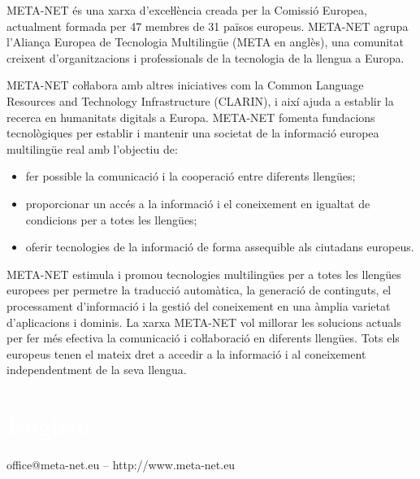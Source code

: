 \begin{multicols}{2}

META-NET és una xarxa d’exceŀlència creada per la Comissió Europea, actualment formada per 47 membres de 31 països europeus. META-NET agrupa l’Aliança Europea de Tecnologia Multilingüe (META en anglès), una comunitat creixent d’organitzacions i professionals de la tecnologia de la llengua a Europa. 

META-NET coŀlabora amb altres iniciatives com la Common Language Resources and Technology Infrastructure (CLARIN), i així ajuda a establir la recerca en humanitats digitals a Europa. META-NET fomenta fundacions tecnològiques per establir i mantenir una societat de la informació europea multilingüe real amb l’objectiu de:
\begin{itemize}
\item fer possible la comunicació i la cooperació entre diferents llengües;
\item proporcionar un accés a la informació i el coneixement en igualtat de condicions per a totes les llengües;
\item oferir tecnologies de la informació de forma assequible als ciutadans europeus.
\end{itemize}

META-NET estimula i promou tecnologies multilingües per a totes les llengües europees per permetre la traducció automàtica, la generació de continguts, el processament d’informació i la gestió del coneixement en una àmplia varietat d’aplicacions i dominis. La xarxa META-NET vol millorar les solucions actuals per fer més efectiva la comunicació i coŀlaboració en diferents llengües. Tots els europeus tenen el mateix dret a accedir a la informació i al coneixement independentment de la seva llengua. 

\end{multicols}

\vfill

\makeatletter
{}
{
  \renewcommand*{\theHsection}{\thepart.\thesection}
}
\makeatother
\part*{\textcolor{white}{English}}
\setcounter{section}{0}
\setcounter{figure}{0}

\centerline{office@meta-net.eu -- http://www.meta-net.eu}


